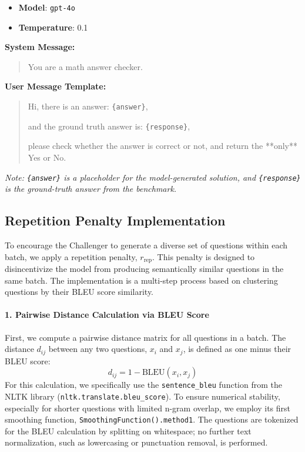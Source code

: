 \begin{tcolorbox}[
  colback=blue!5!white,
  colframe=blue!75!black,
  title=\textbf{Configuration for GPT-4o as Judge},
  fonttitle=\bfseries,
  sharp corners
]
\begin{itemize}
    \item \textbf{Model}: \texttt{gpt-4o}
    \item \textbf{Temperature}: 0.1
\end{itemize}

\textbf{System Message:}
\begin{quote}
You are a math answer checker.
\end{quote}

\textbf{User Message Template:}
\begin{quote}
Hi, there is an answer: \texttt{\{answer\}},

and the ground truth answer is: \texttt{\{response\}},

please check whether the answer is correct or not, and return the **only** Yes or No.
\end{quote}
\textit{Note: \texttt{\{answer\}} is a placeholder for the model-generated solution, and \texttt{\{response\}} is the ground-truth answer from the benchmark.}
\end{tcolorbox}

\subsection{Repetition Penalty Implementation}
\label{app:penalty}
To encourage the Challenger to generate a diverse set of questions within each batch, we apply a repetition penalty, $r_{\text{rep}}$. This penalty is designed to disincentivize the model from producing semantically similar questions in the same batch. The implementation is a multi-step process based on clustering questions by their BLEU score similarity.

\paragraph{1. Pairwise Distance Calculation via BLEU Score}
First, we compute a pairwise distance matrix for all questions in a batch. The distance $d_{ij}$ between any two questions, $x_i$ and $x_j$, is defined as one minus their BLEU score:
\[
d_{ij} = 1 - \text{BLEU}(x_i, x_j)
\]
For this calculation, we specifically use the \texttt{sentence\_bleu} function from the NLTK library (\texttt{nltk.translate.bleu\_score}). To ensure numerical stability, especially for shorter questions with limited n-gram overlap, we employ its first smoothing function, \texttt{SmoothingFunction().method1}. The questions are tokenized for the BLEU calculation by splitting on whitespace; no further text normalization, such as lowercasing or punctuation removal, is performed.


